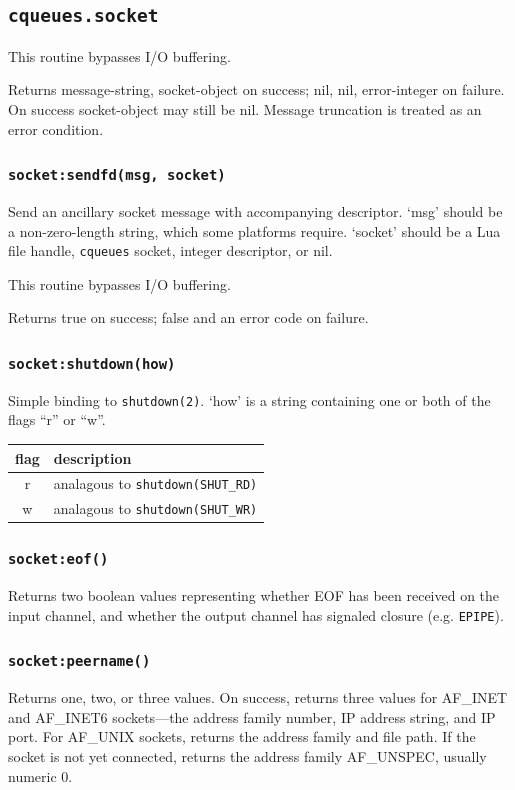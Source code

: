 \documentclass[11pt, oneside]{memoir}
\newcommand*{\cqueues}[0]{\texttt{cqueues}\xspace}
\newcommand*{\syscall}[1]{\texttt{#1}\xspace}
\newcommand*{\fn}[1]{\texttt{#1}\xspace}
\newcommand*{\errno}[1]{\texttt{#1}\xspace}
\newcounter{toccols}
\newenvironment{Module}[1]{
	\subsection{\texttt{#1}}
	\addtocontents{toc}{
		\protect\begin{multicols}{\value{toccols}}
	}
}{
	\addtocontents{toc}{\protect\end{multicols}}
}
\begin{document}
\begin{Module}{cqueues.socket}
This routine bypasses I/O buffering.

Returns message-string, socket-object on success; nil, nil, error-integer on failure. On success socket-object may still be nil. Message truncation is treated as an error condition.

\subsubsection[\fn{socket:sendfd}]{\fn{socket:sendfd(msg, socket)}}
Send an ancillary socket message with accompanying descriptor. `msg' should be a non-zero-length string, which some platforms require. `socket' should be a Lua file handle, \cqueues socket, integer descriptor, or nil.

This routine bypasses I/O buffering.

Returns true on success; false and an error code on failure.

\subsubsection[\fn{socket:shutdown}]{\fn{socket:shutdown(how)}}
Simple binding to \syscall{shutdown(2)}. `how' is a string containing one or both of the flags ``r'' or ``w''.

\begin{tabular}{c | l}
flag & description \\\hline
r & analagous to \syscall{shutdown(SHUT\_RD)} \\
w & analagous to \syscall{shutdown(SHUT\_WR)} \\
\end{tabular}

\subsubsection[\fn{socket:eof}]{\fn{socket:eof()}}
Returns two boolean values representing whether EOF has been received on the input channel, and whether the output channel has signaled closure (e.g. \errno{EPIPE}).

\subsubsection[\fn{socket:peername}]{\fn{socket:peername()}}
Returns one, two, or three values. On success, returns three values for AF\_INET and AF\_INET6 sockets---the address family number, IP address string, and IP port. For AF\_UNIX sockets, returns the address family and file path. If the socket is not yet connected, returns the address family AF\_UNSPEC, usually numeric 0.


\end{Module}
\end{document}
